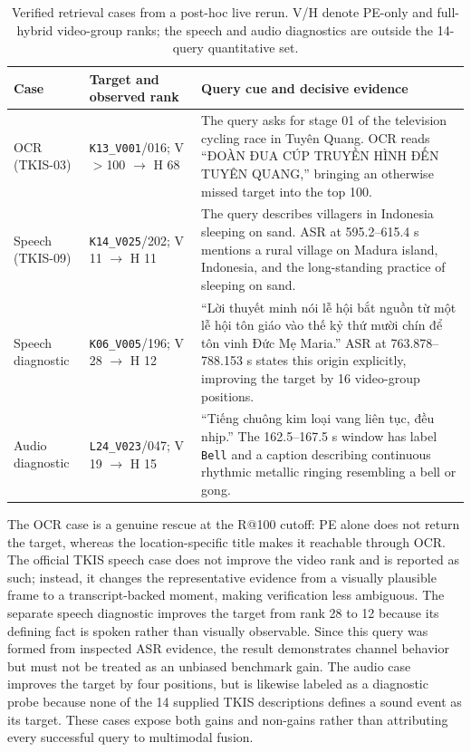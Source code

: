 \documentclass[conference]{IEEEtran}
\begin{document}
\begin{table}[!t]
\centering
\caption{Verified retrieval cases from a post-hoc live rerun. V/H denote
PE-only and full-hybrid video-group ranks; the speech and audio diagnostics are
outside the 14-query quantitative set.}
\label{tab:verified-cases}
\scriptsize
\setlength{\tabcolsep}{2pt}
\begin{tabularx}{\columnwidth}{@{}>{\raggedright\arraybackslash}p{}>{\raggedright\arraybackslash}p{}X@{}}
\toprule
Case & Target and observed rank & Query cue and decisive evidence \\
\midrule
OCR (TKIS-03) & \texttt{K13\_V001}/016; V $>$100 $\rightarrow$ H 68 &
The query asks for stage 01 of the television cycling race in Tuyên Quang. OCR
reads ``ĐOÀN ĐUA CÚP TRUYỀN HÌNH ĐẾN TUYÊN QUANG,'' bringing an otherwise missed
target into the top 100. \\
Speech (TKIS-09) & \texttt{K14\_V025}/202; V 11 $\rightarrow$ H 11 &
The query describes villagers in Indonesia sleeping on sand. ASR at
595.2--615.4 s mentions a rural village on Madura island, Indonesia, and the
long-standing practice of sleeping on sand. \\
Speech diagnostic & \texttt{K06\_V005}/196; V 28 $\rightarrow$ H 12 &
``Lời thuyết minh nói lễ hội bắt nguồn từ một lễ hội tôn giáo vào thế kỷ thứ
mười chín để tôn vinh Đức Mẹ Maria.'' ASR at 763.878--788.153 s states this
origin explicitly, improving the target by 16 video-group positions. \\
Audio diagnostic & \texttt{L24\_V023}/047; V 19 $\rightarrow$ H 15 &
``Tiếng chuông kim loại vang liên tục, đều nhịp.'' The 162.5--167.5 s window has
label \texttt{Bell} and a caption describing continuous rhythmic metallic
ringing resembling a bell or gong. \\
\bottomrule
\end{tabularx}
\end{table}

The OCR case is a genuine rescue at the R@100 cutoff: PE alone does not return
the target, whereas the location-specific title makes it reachable through OCR.
The official TKIS speech case does not improve the video rank and is reported as
such; instead, it changes the representative evidence from a visually plausible
frame to a transcript-backed moment, making verification less ambiguous. The
separate speech diagnostic improves the target from rank 28 to 12 because its
defining fact is spoken rather than visually observable. Since this query was
formed from inspected ASR evidence, the result demonstrates channel behavior but
must not be treated as an unbiased benchmark gain. The audio case improves the
target by four positions, but is likewise labeled as a diagnostic probe because
none of the 14 supplied TKIS descriptions defines a sound event as its target.
These cases expose both gains and non-gains rather than attributing every
successful query to multimodal fusion.
\end{document}

